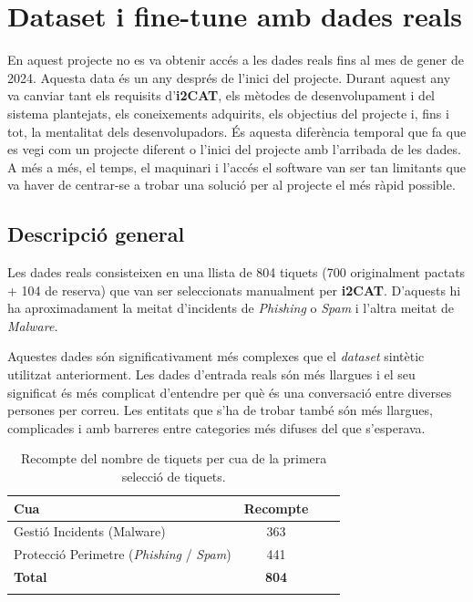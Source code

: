 \section{Dataset i fine-tune amb dades reals}
En aquest projecte no es va obtenir accés a les dades reals fins al mes de gener de 2024. Aquesta data és un any després de l'inici del projecte. Durant aquest any va canviar tant els requisits d'\textbf{i2CAT}, els mètodes de desenvolupament i del sistema plantejats, els coneixements adquirits, els objectius del projecte i, fins i tot, la mentalitat dels desenvolupadors. És aquesta diferència temporal que fa que es vegi com un projecte diferent o l'inici del projecte amb l'arribada de les dades. A més a més, el temps, el maquinari i l'accés el software van ser tan limitants que va haver de centrar-se a trobar una solució per al projecte el més ràpid possible.

\subsection{Descripció general}
Les dades reals consisteixen en una llista de 804 tiquets (700 originalment pactats + 104 de reserva) que van ser seleccionats manualment per \textbf{i2CAT}. D'aquests hi ha aproximadament la meitat d'incidents de \textit{Phishing} o \textit{Spam} i l'altra meitat de \textit{Malware}.

Aquestes dades són significativament més complexes que el \textit{dataset} sintètic utilitzat anteriorment. Les dades d'entrada reals són més llargues i el seu significat és més complicat d'entendre per què és una conversació entre diverses persones per correu. Les entitats que s'ha de trobar també són més llargues, complicades i amb barreres entre categories més difuses del que s'esperava.

\begin{table}[H]
    \centering
    \begin{tabular}{lccr}
        \Xhline{2\arrayrulewidth}
        \textbf{Cua} & \textbf{Recompte} \\
        \hline
        Gestió Incidents (Malware) & 363 \\
        Protecció Perimetre (\textit{Phishing} / \textit{Spam}) & 441  \\
        \hline
        \textbf{Total} & \textbf{804} \\
        \Xhline{2\arrayrulewidth}
    \end{tabular}
    \caption{Recompte del nombre de tiquets per cua de la primera selecció de tiquets.}
    \label{tab:recompte_per_cua}
\end{table}

